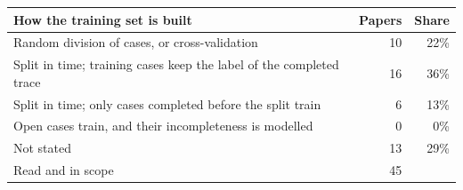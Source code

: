 \begin{tabular}{>{\raggedright\arraybackslash}p{9cm}rr}
\toprule
How the training set is built & Papers & Share \\
\midrule
Random division of cases, or cross-validation & 10 & 22\% \\
Split in time; training cases keep the label of the completed trace & 16 & 36\% \\
Split in time; only cases completed before the split train & 6 & 13\% \\
Open cases train, and their incompleteness is modelled & 0 & 0\% \\
Not stated & 13 & 29\% \\
\midrule
Read and in scope & 45 & \\
\bottomrule
\end{tabular}
